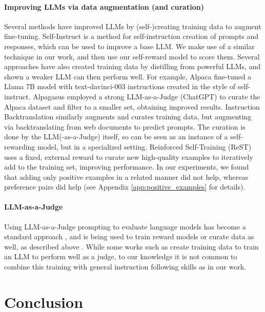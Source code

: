 \documentclass{article}
\begin{document}
\paragraph{Improving LLMs via data augmentation (and curation)}
Several methods have improved LLMs by (self-)creating training data to augment fine-tuning. Self-Instruct \citep{wang2022self} is a method for self-instruction creation of prompts and responses, which can be used to improve a base LLM. We make use of a similar technique in our work, and then use our self-reward model to score them.
Several approaches have also created training data by
distilling from powerful LLMs, and shown 
a weaker LLM can then perform well. For example,  Alpaca \citep{alpaca} fine-tuned a Llama 7B  model with text-davinci-003 instructions created in the style of self-instruct.  Alpagasus \citep{chen2023alpagasus} employed a strong LLM-as-a-Judge (ChatGPT) to curate the Alpaca dataset and filter to a smaller set, obtaining improved results. Instruction Backtranslation \citep{li2023self} similarly augments and curates training data, but augmenting via backtranslating from web documents to predict prompts. The curation is done by the LLM(-as-a-Judge) itself, so can be seen as an instance of a self-rewarding model, but in a specialized setting.
Reinforced Self-Training (ReST) \citep{gulcehre2023reinforced} uses a fixed, external reward to curate new high-quality examples to iteratively add to the training set, improving performance. In our experiments, we found that adding only positive examples in a related manner did not help, whereas  preference pairs did help (see Appendix \autoref{app:positive_examples} for details).




\paragraph{LLM-as-a-Judge}
Using LLM-as-a-Judge prompting to evaluate language models has become a 
standard approach \citep{dubois2023alpacafarm,alpaca_eval,fernandes2023devil,bai2023benchmarking,saha2023branch}, and is being used to train reward models or curate data as well, as described above \citep{lee2023rlaif,chen2023alpagasus,li2023self}. While some works such as \citet{kim2023prometheus} create training data to train an LLM to perform well as a judge, to our knowledge it is not common to combine this training with general instruction following skills as in our work.



\section{Conclusion}
\end{document}

